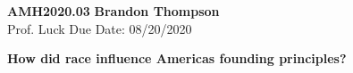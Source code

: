 \noindent
\textbf{AMH2020.03} \hfill \textbf{Brandon Thompson} \\
\normalsize Prof. Luck \hfill Due Date: 08/20/2020 \\

\begin{center}
\textbf{How did race influence Americas founding principles?}
\end{center}
